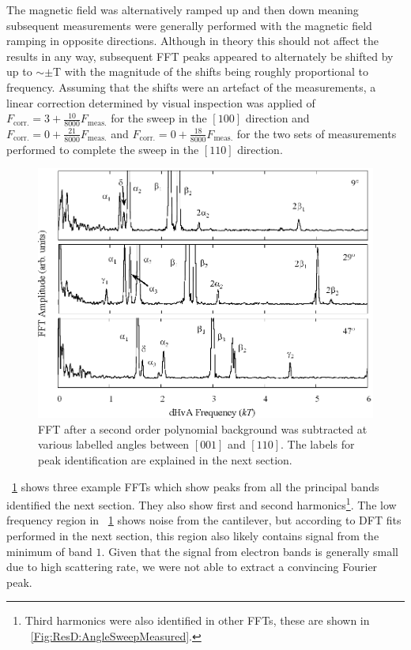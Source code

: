 The magnetic field was alternatively ramped up and then down meaning subsequent measurements were generally performed with the magnetic field ramping in opposite directions. Although in theory this should not affect the results in any way, subsequent FFT peaks appeared to alternately be shifted by up to $\sim\pm$\unit[21]{T} with the magnitude of the shifts being roughly proportional to frequency. Assuming that the shifts were an artefact of the measurements, a linear correction determined by visual inspection was applied of $F_{\textrm{corr.}} = 3 + \frac{10}{8000} F_{\textrm{meas.}}$ for the sweep in the $[100]$ direction and $F_{\textrm{corr.}} = 0 + \frac{21}{8000}  F_{\textrm{meas.}}$ and  $F_{\textrm{corr.}} = 0 + \frac{18}{8000} F_{\textrm{meas.}}$ for the two sets of measurements performed to complete the sweep in the $[110]$ direction.

\begin{figure}[htbp]
    \begin{center}
        \includegraphics[scale=0.7]{Chapter-dHvABaFe2P2/Figures/AngleDepMeasurements/FFTExamples/FFTExamples}
        \caption{FFT after a second order polynomial background was subtracted at various labelled angles between $[001]$ and $[110]$. The labels for peak identification are explained in the next section.}
        \label{Fig:ResD:FFTExamples}
    \end{center}
\end{figure}
\Fig~\ref{Fig:ResD:FFTExamples} shows three example FFTs which show peaks from all the principal bands identified the next section. They also show first and second harmonics\footnote{Third harmonics were also identified in other FFTs, these are shown in \fig~\ref{Fig:ResD:AngleSweepMeasured}.}. The low frequency region in \fig~\ref{Fig:ResD:FFTExamples} shows noise from the cantilever, but according to DFT fits performed in the next section, this region also likely contains signal from the minimum of band $1$. Given that the signal from electron bands is generally small due to high scattering rate, we were not able to extract a convincing Fourier peak.

